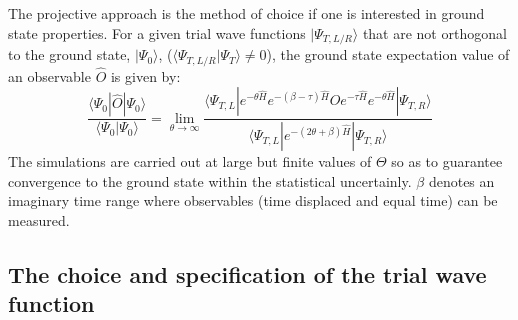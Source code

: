 

The projective  approach is the method of choice if  one is interested in ground state properties.   For a given trial wave functions  $| \Psi_{T,L/R} \rangle  $  that are  not orthogonal to the ground state,  $| \Psi_0 \rangle  $,   
($  \langle \Psi_{T,L/R}  | \Psi_T \rangle  \neq 0  $), the ground state expectation value of an observable  $\hat{O} $ is given by: 
\begin{equation}
	 \frac{ \langle \Psi_0 | \hat{O} | \Psi_0 \rangle }{ \langle \Psi_0 | \Psi_0 \rangle}   = \lim_{\theta \rightarrow \infty}  
	 \frac{ \langle \Psi_{T,L} | e^{-\theta \hat{H}}  e^{-(\beta - \tau)\hat{H}  }\hat{O} e^{- \tau  \hat{H} }   e^{-\theta \hat{H}} | \Psi_{T,R} \rangle } 
	        { \langle \Psi_{T,L} | e^{-(2 \theta + \beta) \hat{H}  } | \Psi_{T,R} \rangle } 
\end{equation}
The simulations are carried out at large  but finite values of  $\Theta$ so as to guarantee convergence to the ground  state within the statistical uncertainly.   $\beta$ denotes an imaginary time range where  observables 
(time displaced and equal time) can be measured.  


\subsection{The choice and specification of the trial wave function}